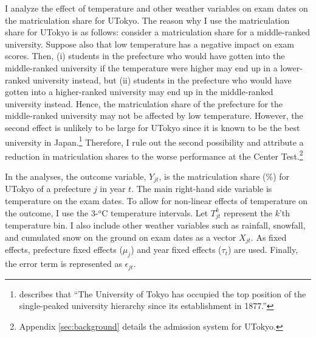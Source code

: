 \documentclass[12pt,letterpaper]{article}
\begin{document}
I analyze the effect of temperature and other weather variables on exam dates on the matriculation share for UTokyo.
The reason why I use the matriculation share for UTokyo is as follows:
consider a matriculation share for a middle-ranked university.
Suppose also that low temperature has a negative impact on exam scores.
Then, 
(i) students in the prefecture who would have gotten into the middle-ranked university if the temperature were higher may end up in a lower-ranked university instead, but
(ii) students in the prefecture who would have gotten into a higher-ranked university may end up in the middle-ranked university instead.
Hence, the matriculation share of the prefecture for the middle-ranked university may not be affected by low temperature.
However, the second effect is unlikely to be large for UTokyo since it is known to be the best university in Japan.\footnote{
  \citet{Kawaguchi2008} describes that ``The University of Tokyo has occupied the top position of the single-peaked university hierarchy since its establishment in 1877.''
}
Therefore, I rule out the second possibility and attribute a reduction in matriculation shares to the worse performance at the Center Test.\footnote{
  Appendix \ref{sec:background} details the admission system for UTokyo.
}

In the analyses, the outcome variable, $Y_{jt}$, is the matriculation share (\%) for UTokyo of a prefecture $j$ in year $t$.
The main right-hand side variable is temperature on the exam dates.
To allow for non-linear effects of temperature on the outcome, I use the 3-$^o$C temperature intervals.
Let $T_{jt}^k$ represent the $k$'th temperature bin.
I also include other weather variables such as rainfall, snowfall, and cumulated snow on the ground on exam dates as a vector $X_{jt}$.
As fixed effects, prefecture fixed effects ($\mu_j$) and year fixed effects ($\tau_t$) are used.
Finally, the error term is represented as $\epsilon_{jt}$.
\end{document}
